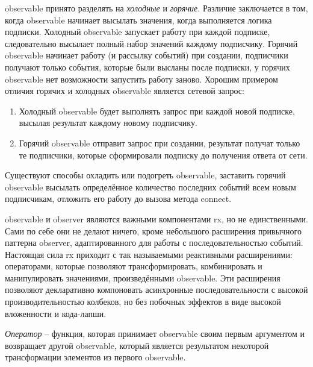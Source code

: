 \gls{observable} принято разделять на \emph{холодные} и \emph{горячие}. Различие заключается в том, когда \gls{observable} начинает высылать значения, когда выполняется логика подписки. Холодный \gls{observable} запускает работу при каждой подписке, следовательно высылает полный набор значений каждому подписчику. Горячий \gls{observable} начинает работу (и рассылку событий) при создании, подписчики получают только события, которые были высланы после подписки, у горячих \gls{observable} нет возможности запустить работу заново. Хорошим примером отличия горячих и холодных \gls{observable} является сетевой запрос:

\begin{enumerate}
	\item Холодный \gls{observable} будет выполнять запрос при каждой новой подписке, высылая результат каждому новому подписчику.
	\item Горячий \gls{observable} отправит запрос при создании, результат получат только те подписчики, которые сформировали подписку до получения ответа от сети.
\end{enumerate}

Существуют способы охладить или подогреть \gls{observable}, заставить горячий \gls{observable} высылать определённое количество последних событий всем новым подписчикам, отложить его работу до вызова метода connect.

\gls{observable} и \gls{observer} являются важными компонентами \gls{rx}, но не единственными. Сами по себе они не делают ничего, кроме небольшого расширения привычного паттерна \gls{observer}, адаптированного для работы с последовательностью событий. Настоящая сила \gls{rx} приходит с так называемыми реактивными расширениями: операторами, которые позволяют трансформировать, комбинировать и манипулировать значениями, произведёнными \gls{observable}. Эти расширения позволяют декларативно компоновать асинхронные последовательности с высокой производительностью колбеков, но без побочных эффектов в виде высокой вложенности и кода-лапши.

\emph{Оператор} -- функция, которая принимает \gls{observable} своим первым аргументом и возвращает другой \gls{observable}, который является результатом некоторой трансформации элементов из первого \gls{observable}.
